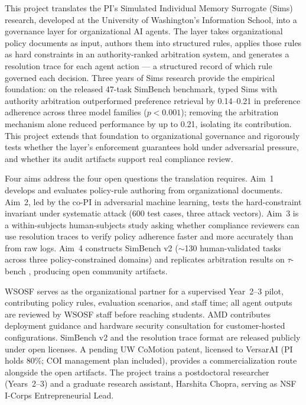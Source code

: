 \documentclass[11pt]{article}
\begin{document}
This project translates the PI's Simulated Individual Memory Surrogate (Sims) research, developed at the University of Washington's Information School, into a governance layer for organizational AI agents. The layer takes organizational policy documents as input, authors them into structured rules, applies those rules as hard constraints in an authority-ranked arbitration system, and generates a resolution trace for each agent action --- a structured record of which rule governed each decision. Three years of Sims research provide the empirical foundation: on the released 47-task SimBench benchmark, typed Sims with authority arbitration outperformed preference retrieval by 0.14--0.21 in preference adherence across three model families ($p < 0.001$); removing the arbitration mechanism alone reduced performance by up to 0.21, isolating its contribution. This project extends that foundation to organizational governance and rigorously tests whether the layer's enforcement guarantees hold under adversarial pressure, and whether its audit artifacts support real compliance review.

Four aims address the four open questions the translation requires. Aim~1 develops and evaluates policy-rule authoring from organizational documents. Aim~2, led by the co-PI in adversarial machine learning, tests the hard-constraint invariant under systematic attack (600 test cases, three attack vectors). Aim~3 is a within-subjects human-subjects study asking whether compliance reviewers can use resolution traces to verify policy adherence faster and more accurately than from raw logs. Aim~4 constructs SimBench v2 ($\sim$130 human-validated tasks across three policy-constrained domains) and replicates arbitration results on $\tau$-bench \citep{yao2024tau}, producing open community artifacts.

WSOSF serves as the organizational partner for a supervised Year~2--3 pilot, contributing policy rules, evaluation scenarios, and staff time; all agent outputs are reviewed by WSOSF staff before reaching students. AMD contributes deployment guidance and hardware security consultation for customer-hosted configurations. SimBench v2 and the resolution trace format are released publicly under open licenses. A pending UW CoMotion patent, licensed to VersarAI (PI holds 80\%; COI management plan included), provides a commercialization route alongside the open artifacts. The project trains a postdoctoral researcher (Years~2--3) and a graduate research assistant, Harshita Chopra, serving as NSF I-Corps Entrepreneurial Lead.
\end{document}
